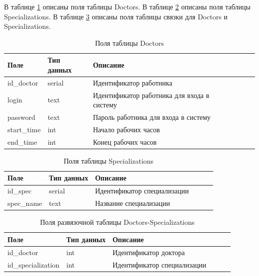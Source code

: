 В таблице \ref{tab:doctors}  описаны поля таблицы Doctors. В таблице \ref{tab:specializations} описаны поля таблицы Specializations. В таблице \ref{tab:DC} описаны поля таблицы связки для Doctors и Specializations. 
\begin{table}[hbtp]
	\begin{center}
			\caption{\label{tab:doctors}Поля таблицы Doctors}
		\begin{tabular}{|l|l|l|l|l|l|}
			\hline {Поле} & {Тип данных} & {Описание}  \\ \hline
			id\_doctor  & serial & Идентификатор работника   \\ \hline
			login & text & Идентификатор работника для входа в систему \\ \hline
			password & text & Пароль работника для входа в систему  \\ \hline
			start\_time & int & Начало рабочих часов\\ \hline
			end\_time & int & Конец рабочих часов\\ \hline
		\end{tabular}
	\end{center}
\end{table}

\begin{table}[hbtp]
	\begin{center}
		\caption{\label{tab:specializations}Поля таблицы Specializations}
		\begin{tabular}{|l|l|l|l|l|l|}
			\hline {Поле} & {Тип данных} & {Описание}  \\ \hline
			id\_spec  & serial & Идентификатор специализации \\ \hline
			spec\_name & text & Название специализации\\ \hline
		\end{tabular}
	\end{center}
\end{table}

\begin{table}[hbtp]
	\begin{center}
		\caption{\label{tab:DC}Поля развязочной таблицы Doctors-Specializations}
		\begin{tabular}{|l|l|l|l|l|l|}
			\hline {Поле} & {Тип данных} & {Описание}  \\ \hline
			id\_doctor  & int & Идентификатор доктора \\ \hline
			id\_specialization & int & Идентификатор специализации \\ \hline
		\end{tabular}
	\end{center}
\end{table}

